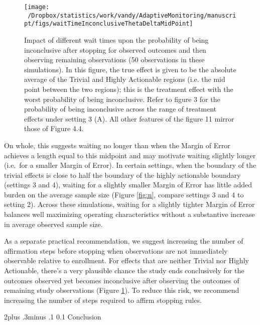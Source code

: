 \documentclass[12pt,oneside]{book}
\makeatletter
\newlength{\li}\setlength{\li}{14.48pt}
\newlength{\di}\setlength{\di}{-3.5mm}
\renewcommand\section{ \@startsection {section}{1}{\z@}%
    {2\@bls  plus .3\@bls minus .1\@bls}%
    {0.1\@bls}%
    {\centering\normalfont}}
\theoremstyle{definition}
\theoremstyle{definition}
\theoremstyle{definition}
\theoremstyle{remark}
\makeatother
\begin{document}
\begin{figure}[H]

{\centering \texttt{[image: ~/Dropbox/statistics/work/vandy/AdaptiveMonitoring/manuscript/figs/waitTimeInconclusiveThetaDeltaMidPoint]} 

}

\caption{Impact of different wait times upon the probability of being inconclusive after stopping for observed outcomes and then observing remaining observations (50 observations in these simulations).  In this figure, the true effect is given to be the absolute average of the Trivial and Highly Actionable regions (i.e. the mid point between the two regions); this is the treatment effect with the worst probability of being inconclusive.  Refer to figure 3 for the probability of being inconclusive across the range of treatment effects under setting 3 (A). All other features of the figure 11 mirror those of Figure 4.4.}\label{fig:inconclusive}
\end{figure}

On whole, this suggests waiting no longer than when the Margin of Error
achieves a length equal to this midpoint and may motivate waiting
slightly longer (i.e.~for a smaller Margin of Error). In certain
settings, when the boundary of the trivial effects is close to half the
boundary of the highly actionable boundary (settings 3 and 4), waiting
for a slightly smaller Margin of Error has little added burden on the
average sample size (Figure \ref{fig:n}, compare settings 3 and 4 to
setting 2). Across these simulations, waiting for a slightly tighter
Margin of Error balances well maximizing operating characteristics
without a substantive increase in average observed sample size.

As a separate practical recommendation, we suggest increasing the number
of affirmation steps before stopping when observations are not
immediately observable relative to enrollment. For effects that are
neither Trivial nor Highly Actionable, there's a very plausible chance
the study ends conclusively for the outcomes observed yet becomes
inconclusive after observing the outcomes of remaining study
observations (Figure \ref{fig:inconclusive}). To reduce this risk, we
recommend increasing the number of steps required to affirm stopping
rules.

\hypertarget{conclusion}{%
\section{Conclusion}\label{conclusion}}
\end{document}
